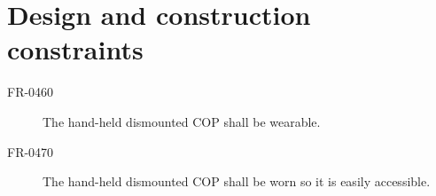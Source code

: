  \section{Design and construction constraints}
 \begin{description}
 \item[FR-0460] The hand-held dismounted COP shall be wearable.
 \item[FR-0470] The hand-held dismounted COP shall be worn so it is easily accessible.
 \end{description}